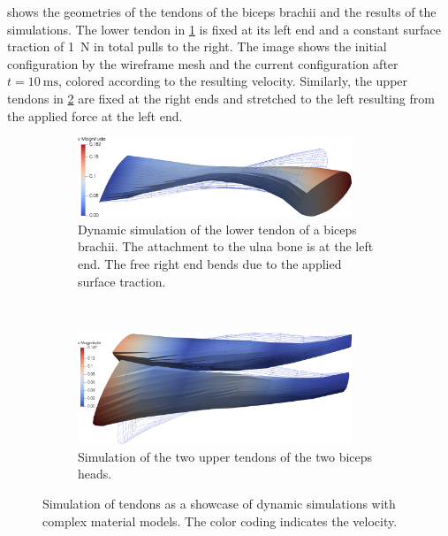  shows the geometries of the tendons of the biceps brachii and the results of the simulations. The lower tendon in \cref{fig:dynamic_mooney_rivlin_6} is fixed at its left end and a constant surface traction of \SI{1}{\newton} in total pulls to the right. The image shows the initial configuration by the wireframe mesh and the current configuration after $t=\SI{10}{\ms}$, colored according to the resulting velocity.
Similarly, the upper tendons in \cref{fig:dynamic_mooney_rivlin_7} are fixed at the right ends and stretched to the left resulting from the applied force at the left end.

\begin{figure}
  \centering%
  \begin{subfigure}[t]{\textwidth}%
    \centering%
    \includegraphics[width=0.9\textwidth]{images/results/basic/dynamic_mooney_rivlin_6.png}%
    \caption{Dynamic simulation of the lower tendon of a biceps brachii. The attachment to the ulna bone is at the left end. The free right end bends due to the applied surface traction.}%
    \label{fig:dynamic_mooney_rivlin_6}%
  \end{subfigure}\\[4mm]
  \begin{subfigure}[t]{\textwidth}%
    \centering%
    \includegraphics[width=0.9\textwidth]{images/results/basic/dynamic_mooney_rivlin_7.png}%
    \caption{Simulation of the two upper tendons of the two biceps heads.}%
    \label{fig:dynamic_mooney_rivlin_7}%
  \end{subfigure}
  \caption{Simulation of tendons as a showcase of dynamic simulations with complex material models. The color coding indicates the velocity.}%
  \label{fig:tendon_material_simulation}%
\end{figure}%

